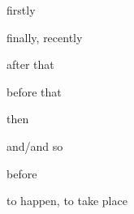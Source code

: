 \documentclass[avery5371,grid,frame]{flashcards}
\begin{document}
\begin{flashcard}{\LARGE firstly}
\LARGE {}
\end{flashcard}
\begin{flashcard}{\LARGE finally, recently}
\LARGE {}
\end{flashcard}
\begin{flashcard}{\LARGE after that}
\LARGE {}
\end{flashcard}
\begin{flashcard}{\LARGE before that}
\LARGE {}
\end{flashcard}
\begin{flashcard}{\LARGE then}
\LARGE {}
\end{flashcard}
\begin{flashcard}{\LARGE and/and so}
\LARGE {}
\end{flashcard}
\begin{flashcard}{\LARGE before}
\LARGE {}
\end{flashcard}
\begin{flashcard}{\LARGE to happen, to take place}
\LARGE {}
\end{flashcard}
\end{document}
